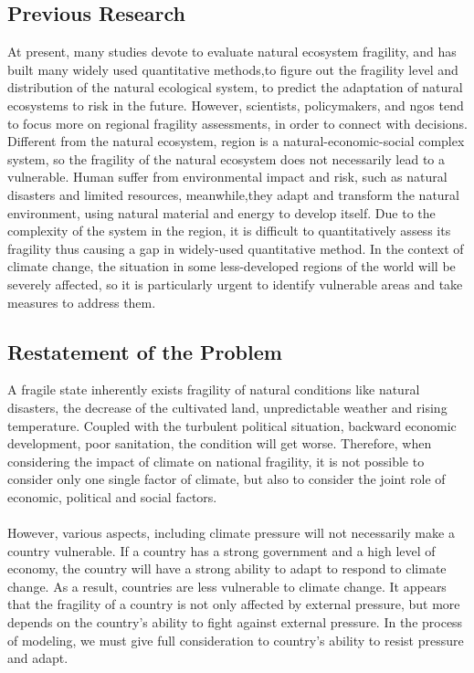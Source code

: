 \documentclass{mcmthesis}
\begin{document}
\subsection{Previous Research}
At present, many studies devote to evaluate natural ecosystem fragility, 
and has built many widely used quantitative methods,to figure out the 
fragility level and distribution of the natural ecological system, 
to predict the adaptation of natural ecosystems to risk in the future. However, 
scientists, policymakers, and ngos tend to focus more on regional 
fragility assessments, in order to connect with decisions. Different 
from the natural ecosystem, region is a natural-economic-social complex 
system, so the fragility of the natural ecosystem does not necessarily lead 
to a vulnerable. Human suffer from environmental impact and risk, such as 
natural disasters and limited resources, meanwhile,they adapt and transform 
the natural environment, using natural material and energy to develop itself.
Due to the complexity of the system in the region, it is difficult to 
quantitatively assess its fragility thus causing a gap in widely-used 
quantitative method. In the context of climate change, the situation in some
less-developed regions of the world will be severely affected, so it is 
particularly urgent to identify vulnerable areas and take measures to 
address them.


\subsection{Restatement of the Problem}
A fragile state inherently exists fragility of natural conditions 
like natural disasters, the decrease of the cultivated land, unpredictable 
weather and rising temperature. Coupled with the turbulent political situation, 
backward economic development, poor sanitation, the condition will get worse. 
Therefore, when considering the impact of climate on national fragility, 
it is not possible to consider only one single factor of climate, but also to
consider the joint role of economic, political and social factors.\\\\
However, various aspects, including climate pressure will not necessarily 
make a country vulnerable. If a country has a strong government and a high 
level of economy, the country will have a strong ability to adapt to respond
to climate change. As a result, countries are less vulnerable to climate 
change. It appears that the fragility of a country is not only affected
by external pressure, but more depends on the country's ability to fight 
against external pressure. In the process of modeling, we must give full 
consideration to country's ability to resist pressure and adapt.
\end{document}
